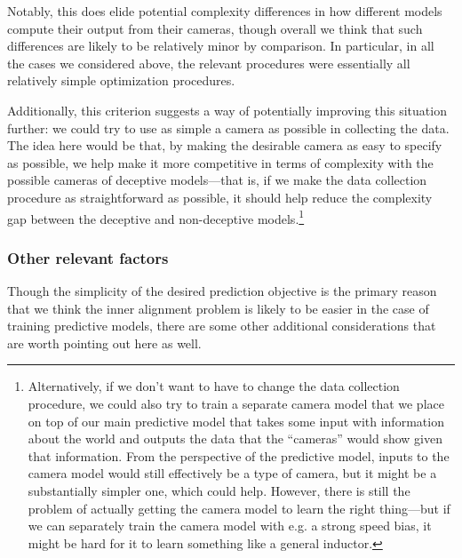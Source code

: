 \documentclass[
  onecolumn,
  nonatbib,
]{miri-tech-article}
\begin{document}
Notably, this does elide potential complexity differences in how different models compute their output from their cameras, though overall we think that such differences are likely to be relatively minor by comparison. In particular, in all the cases we considered above, the relevant procedures were essentially all relatively simple optimization procedures.

Additionally, this criterion suggests a way of potentially improving this situation further: we could try to use as simple a camera as possible in collecting the data. The idea here would be that, by making the desirable camera as easy to specify as possible, we help make it more competitive in terms of complexity with the possible cameras of deceptive models---that is, if we make the data collection procedure as straightforward as possible, it should help reduce the complexity gap between the deceptive and non-deceptive models.\footnote{Alternatively, if we don't want to have to change the data collection procedure, we could also try to train a separate camera model that we place on top of our main predictive model that takes some input with information about the world and outputs the data that the ``cameras'' would show given that information. From the perspective of the predictive model, inputs to the camera model would still effectively be a type of camera, but it might be a substantially simpler one, which could help. However, there is still the problem of actually getting the camera model to learn the right thing---but if we can separately train the camera model with e.g. a strong speed bias, it might be hard for it to learn something like a general inductor.}


\subsubsection{Other relevant factors}

Though the simplicity of the desired prediction objective is the primary reason that we think the inner alignment problem is likely to be easier in the case of training predictive models, there are some other additional considerations that are worth pointing out here as well.
\end{document}
